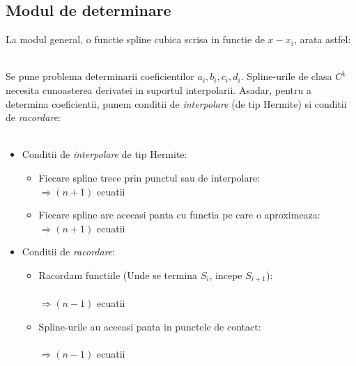 \documentclass{article}
\begin{document}
\subsection{Modul de determinare}
\label{sec:determinare_c1}

\tab La modul general, o functie spline cubica scrisa in functie de $x-x_i$, arata astfel:

\\

Se pune problema determinarii coeficientilor $a_i, b_i, c_i, d_i$. Spline-urile de clasa $C^1$ necesita cunoasterea derivatei in suportul interpolarii. Asadar, pentru a determina coeficientii, punem conditii de \textit{interpolare} (de tip Hermite) si conditii de \textit{racordare}:\\\\

\begin{itemize}
    \item Conditii de \textit{interpolare} de tip Hermite:
    \begin{itemize}
        \item Fiecare spline trece prin punctul sau de interpolare:
        \\$\Rightarrow (n+1)$ ecuatii
        
        \item Fiecare spline are aceeasi panta cu functia pe care o aproximeaza:
        \\$\Rightarrow (n+1)$ ecuatii
    \end{itemize}
    
    \item Conditii de \textit{racordare}:
    \begin{itemize}
        \item Racordam functiile (Unde se termina $S_i$, incepe $S_{i+1}$): \\
        \\$\Rightarrow (n-1)$ ecuatii
        
        \item Spline-urile au aceeasi panta in punctele de contact: \\
        \\$\Rightarrow (n-1)$ ecuatii
    \end{itemize}

\end{itemize}
\end{document}
